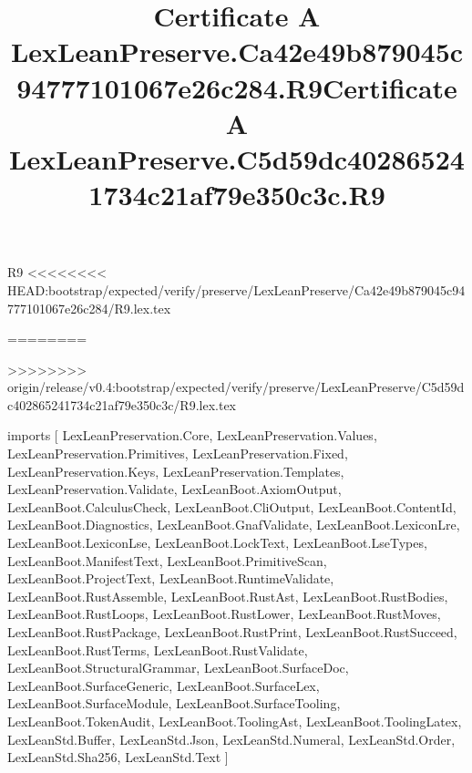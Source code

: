 \begin{lexlean}{R9}
<<<<<<<< HEAD:bootstrap/expected/verify/preserve/LexLeanPreserve/Ca42e49b879045c94777101067e26c284/R9.lex.tex
\title{Certificate A LexLeanPreserve.Ca42e49b879045c94777101067e26c284.R9}
========
\title{Certificate A LexLeanPreserve.C5d59dc402865241734c21af79e350c3c.R9}
>>>>>>>> origin/release/v0.4:bootstrap/expected/verify/preserve/LexLeanPreserve/C5d59dc402865241734c21af79e350c3c/R9.lex.tex
\begin{coremodule}
imports [
  LexLeanPreservation.Core,
  LexLeanPreservation.Values,
  LexLeanPreservation.Primitives,
  LexLeanPreservation.Fixed,
  LexLeanPreservation.Keys,
  LexLeanPreservation.Templates,
  LexLeanPreservation.Validate,
  LexLeanBoot.AxiomOutput,
  LexLeanBoot.CalculusCheck,
  LexLeanBoot.CliOutput,
  LexLeanBoot.ContentId,
  LexLeanBoot.Diagnostics,
  LexLeanBoot.GnafValidate,
  LexLeanBoot.LexiconLre,
  LexLeanBoot.LexiconLse,
  LexLeanBoot.LockText,
  LexLeanBoot.LseTypes,
  LexLeanBoot.ManifestText,
  LexLeanBoot.PrimitiveScan,
  LexLeanBoot.ProjectText,
  LexLeanBoot.RuntimeValidate,
  LexLeanBoot.RustAssemble,
  LexLeanBoot.RustAst,
  LexLeanBoot.RustBodies,
  LexLeanBoot.RustLoops,
  LexLeanBoot.RustLower,
  LexLeanBoot.RustMoves,
  LexLeanBoot.RustPackage,
  LexLeanBoot.RustPrint,
  LexLeanBoot.RustSucceed,
  LexLeanBoot.RustTerms,
  LexLeanBoot.RustValidate,
  LexLeanBoot.StructuralGrammar,
  LexLeanBoot.SurfaceDoc,
  LexLeanBoot.SurfaceGeneric,
  LexLeanBoot.SurfaceLex,
  LexLeanBoot.SurfaceModule,
  LexLeanBoot.SurfaceTooling,
  LexLeanBoot.TokenAudit,
  LexLeanBoot.ToolingAst,
  LexLeanBoot.ToolingLatex,
  LexLeanStd.Buffer,
  LexLeanStd.Json,
  LexLeanStd.Numeral,
  LexLeanStd.Order,
  LexLeanStd.Sha256,
  LexLeanStd.Text
]


\end{coremodule}
\end{lexlean}
